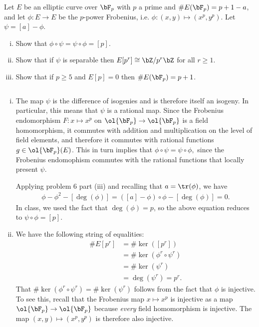 \begin{homework}[e]
	 Let $E$ be an elliptic curve over $\bF_p$ with $p$ a prime and $\#E(\bF_p) = p + 1 - a$, and let $\phi:E\to E$ be the $p$-power Frobenius, i.e. $\phi:(x,y)\mapsto (x^p,y^p)$. Let $\psi = [a] - \phi$.
	\begin{enumerate}[(i)]
		\item Show that $\phi\circ \psi = \psi\circ \phi = [p]$.
		\item Show that if $\psi$ is separable then $E[p^r] \cong \bZ/p^r\bZ$ for all $r \geq 1$.
		\item Show that if $p \geq 5$ and $E[p] = 0$ then $\#E(\bF_p) = p + 1$.
	\end{enumerate}
	\begin{prf}$ $
		\begin{enumerate}[(i)]
			\item The map $\psi$ is the difference of isogenies and is therefore itself an isogeny. In particular, this means that $\psi$ is a rational map. Since the Frobenius endomorphism $F:x\mapsto x^p$ on $\ol{\bF_p} \to \ol{\bF_p}$ is a field homomorphism, it commutes with addition and multiplication on the level of field elements, and therefore it commutes with rational functions $g \in \ol{\bF_p}(E)$. This in turn implies that $\phi \circ \psi = \psi \circ \phi,$ since the Frobenius endomophism commutes with the rational functions that locally present $\psi$.

			Applying problem 6 part (iii) and recalling that $a = \tr(\phi)$, we have
			\begin{align*}
				[\tr(\phi)]\phi - \phi^2 - [\deg(\phi)] = ([a] - \phi)\circ\phi - [\deg(\phi)] = 0.
			\end{align*}
			In class, we used the fact that $\deg(\phi) = p$, so the above equation reduces to $\psi\circ \phi = [p]$.


			\item We have the following string of equalities:
				\begin{align*}
					\#E[p^r] &= \#\ker([p^r]) \\
							 &= \#\ker(\phi^r\circ\psi^r) \\
							 &= \#\ker(\psi^r) \\
							 &= \deg(\psi^r) = p^r.
				\end{align*}
				That $\#\ker(\phi^r\circ \psi^r) = \#\ker(\psi^r)$ follows from the fact that $\phi$ is injective. To see this, recall that the Frobenius map $x\mapsto x^p$ is injective as a map $\ol{\bF_p} \to \ol{\bF_p}$ because \emph{every} field homomorphism is injective. The map $(x,y) \mapsto (x^p,y^p)$ is therefore also injective.


\end{enumerate}
\end{prf}
\end{homework}
